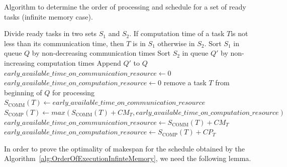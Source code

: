 \documentclass[sigconf]{acmart}
\newcommand{\scomm}{\ensuremath{{S}_{\text{COMM}}}}
\newcommand{\scomp}{\ensuremath{{S}_{\text{COMP}}}}
\begin{document}
	\begin{algorithm}
		\caption{\label{alg:OrderOfExecutionInfinteMemory}Algorithm to determine the order of processing and schedule for a set of ready tasks (infinite memory case).}
		\begin{algorithmic}[1]
			\STATE Divide ready tasks in two sets $S_1$ and $S_2$. If computation time of a task $T$is not less than its communication time, then $T$ is in $S_1$ otherwise in $S_2$.
			\STATE Sort $S_1$ in queue $Q$ by non-decreasing communication times
			\STATE Sort $S_2$ in queue $Q'$ by non-increasing computation times
			\STATE Append $Q'$ to $Q$
			\STATE $early\_available\_time\_on\_communication\_resource \gets 0$
			\STATE $early\_available\_time\_on\_computation\_resource \gets 0$
			\STATE remove a task $T$ from beginning of $Q$ for processing
			\STATE $\scomm(T) \gets  early\_available\_time\_on\_communication\_resource$
			\STATE $\scomp(T) \gets  max(\scomm(T) + CM_T, early\_available\_time\_on\_computation\_resource)$
			\STATE $early\_available\_time\_on\_communication\_resource \gets  \scomm(T) + CM_T$
			\STATE $early\_available\_time\_on\_computation\_resource \gets  \scomp(T) + CP_T$
			\ENDWHILE
		\end{algorithmic}
	\end{algorithm}
	
\noindent In order to prove the optimality of makespan for the schedule obtained by the  Algorithm~\ref{alg:OrderOfExecutionInfinteMemory}, we need the following lemma.
	
\end{document}
